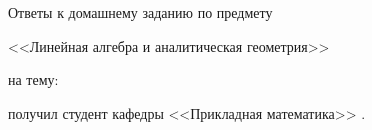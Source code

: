 ﻿\documentclass[a4paper, 14pt]{extarticle}
\begin{document}
 


\onehalfspacing

	\begin{center}
		\large
		Ответы к домашнему заданию \textnumero \thefifteencount{} по предмету 
		
		<<Линейная алгебра и аналитическая геометрия>>

		на тему: \Theme	

		получил студент кафедры <<Прикладная математика>> \GetName.
	\end{center}

	\tableofcontents\label{sec:toc}%
	\clearpage
               
	
\end{document}
